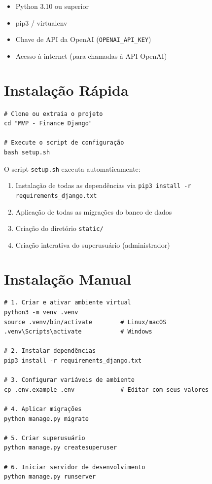 \documentclass[12pt, a4paper, oneside]{report}
\begin{document}
\begin{itemize}
  \item Python 3.10 ou superior
  \item pip3 / virtualenv
  \item Chave de API da OpenAI (\texttt{OPENAI\_API\_KEY})
  \item Acesso à internet (para chamadas à API OpenAI)
\end{itemize}

\section{Instalação Rápida}

\begin{lstlisting}[style=bash, caption={Instalação via script automatizado}]
# Clone ou extraia o projeto
cd "MVP - Finance Django"

# Execute o script de configuração
bash setup.sh
\end{lstlisting}

O script \texttt{setup.sh} executa automaticamente:
\begin{enumerate}
  \item Instalação de todas as dependências via \texttt{pip3 install -r requirements\_django.txt}
  \item Aplicação de todas as migrações do banco de dados
  \item Criação do diretório \texttt{static/}
  \item Criação interativa do superusuário (administrador)
\end{enumerate}

\section{Instalação Manual}

\begin{lstlisting}[style=bash, caption={Instalação passo a passo}]
# 1. Criar e ativar ambiente virtual
python3 -m venv .venv
source .venv/bin/activate        # Linux/macOS
.venv\Scripts\activate           # Windows

# 2. Instalar dependências
pip3 install -r requirements_django.txt

# 3. Configurar variáveis de ambiente
cp .env.example .env             # Editar com seus valores

# 4. Aplicar migrações
python manage.py migrate

# 5. Criar superusuário
python manage.py createsuperuser

# 6. Iniciar servidor de desenvolvimento
python manage.py runserver
\end{lstlisting}
\end{document}
